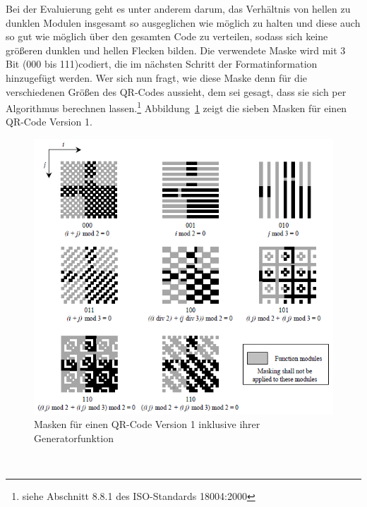 Bei der Evaluierung geht es unter anderem darum, das Verhältnis von hellen zu dunklen Modulen insgesamt so ausgeglichen wie möglich zu halten und diese auch so gut wie möglich über den gesamten Code zu verteilen, sodass sich keine größeren dunklen und hellen Flecken bilden. 
Die verwendete Maske wird mit 3 Bit (000 bis 111)codiert, die im nächsten Schritt der Formatinformation hinzugefügt werden. 
Wer sich nun fragt, wie diese Maske denn für die verschiedenen Größen des QR-Codes aussieht, dem sei gesagt, dass sie sich per Algorithmus berechnen lassen.\footnote{siehe Abschnitt 8.8.1 des ISO-Standards 18004:2000} Abbildung~\ref{fig:qrmasks} zeigt die sieben Masken für einen QR-Code Version 1.
\begin{figure}[htbp]
	\centering
	\includegraphics[width=12.7cm]{Bilder/QR_Mask_Patterns.png}
	\caption[Masken für einen QR-Code Version 1 inklusive ihrer Generatorfunktion]{Masken für einen QR-Code Version 1 inklusive ihrer Generatorfunktion\footnotemark}
	\label{fig:qrmasks}
	\hfill
\end{figure}
~

